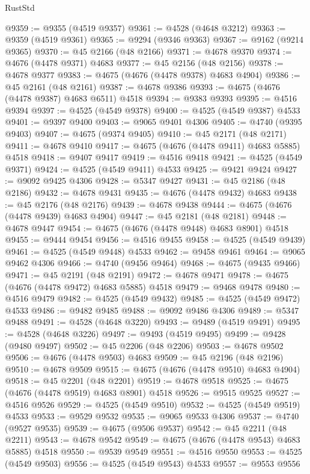 \begin{lexlean}{RustStd}
\begin{coremodule}
{\begin{coremodule}
{{{{{{{{{{{{{{{{{{{{{{{{{{{{{{{{{{{{{{{{{{{{{{{{{{{{{{{{{{{{@9359 := @9355 (@4519 @9357)
@9361 := @4528 (@4648 @3212)
@9363 := @9359 (@4519 @9361)
@9365 := @9294 (@9346 @9363)
@9367 := @9162 (@9214 @9365)
@9370 := @45 @2166 (@48 @2166)
@9371 := @4678 @9370
@9374 := @4676 (@4478 @9371) @4683
@9377 := @45 @2156 (@48 @2156)
@9378 := @4678 @9377
@9383 := @4675 (@4676 (@4478 @9378) @4683 @4904)
@9386 := @45 @2161 (@48 @2161)
@9387 := @4678 @9386
@9393 := @4675 (@4676 (@4478 @9387) @4683 @6511) @4518
@9394 := @9383 @9393
@9395 := @4516 @9394
@9397 := @4525 (@4549 @9378)
@9400 := @4525 (@4549 @9387) @4533
@9401 := @9397 @9400
@9403 := @9065 @9401 @4306
@9405 := @4740 (@9395 @9403)
@9407 := @4675 (@9374 @9405)
@9410 := @45 @2171 (@48 @2171)
@9411 := @4678 @9410
@9417 := @4675 (@4676 (@4478 @9411) @4683 @5885) @4518
@9418 := @9407 @9417
@9419 := @4516 @9418
@9421 := @4525 (@4549 @9371)
@9424 := @4525 (@4549 @9411) @4533
@9425 := @9421 @9424
@9427 := @9092 @9425 @4306
@9428 := @5347 @9427
@9431 := @45 @2186 (@48 @2186)
@9432 := @4678 @9431
@9435 := @4676 (@4478 @9432) @4683
@9438 := @45 @2176 (@48 @2176)
@9439 := @4678 @9438
@9444 := @4675 (@4676 (@4478 @9439) @4683 @4904)
@9447 := @45 @2181 (@48 @2181)
@9448 := @4678 @9447
@9454 := @4675 (@4676 (@4478 @9448) @4683 @8901) @4518
@9455 := @9444 @9454
@9456 := @4516 @9455
@9458 := @4525 (@4549 @9439)
@9461 := @4525 (@4549 @9448) @4533
@9462 := @9458 @9461
@9464 := @9065 @9462 @4306
@9466 := @4740 (@9456 @9464)
@9468 := @4675 (@9435 @9466)
@9471 := @45 @2191 (@48 @2191)
@9472 := @4678 @9471
@9478 := @4675 (@4676 (@4478 @9472) @4683 @5885) @4518
@9479 := @9468 @9478
@9480 := @4516 @9479
@9482 := @4525 (@4549 @9432)
@9485 := @4525 (@4549 @9472) @4533
@9486 := @9482 @9485
@9488 := @9092 @9486 @4306
@9489 := @5347 @9488
@9491 := @4528 (@4648 @3220)
@9493 := @9489 (@4519 @9491)
@9495 := @4528 (@4648 @3226)
@9497 := @9493 (@4519 @9495)
@9499 := @9428 (@9480 @9497)
@9502 := @45 @2206 (@48 @2206)
@9503 := @4678 @9502
@9506 := @4676 (@4478 @9503) @4683
@9509 := @45 @2196 (@48 @2196)
@9510 := @4678 @9509
@9515 := @4675 (@4676 (@4478 @9510) @4683 @4904)
@9518 := @45 @2201 (@48 @2201)
@9519 := @4678 @9518
@9525 := @4675 (@4676 (@4478 @9519) @4683 @8901) @4518
@9526 := @9515 @9525
@9527 := @4516 @9526
@9529 := @4525 (@4549 @9510)
@9532 := @4525 (@4549 @9519) @4533
@9533 := @9529 @9532
@9535 := @9065 @9533 @4306
@9537 := @4740 (@9527 @9535)
@9539 := @4675 (@9506 @9537)
@9542 := @45 @2211 (@48 @2211)
@9543 := @4678 @9542
@9549 := @4675 (@4676 (@4478 @9543) @4683 @5885) @4518
@9550 := @9539 @9549
@9551 := @4516 @9550
@9553 := @4525 (@4549 @9503)
@9556 := @4525 (@4549 @9543) @4533
@9557 := @9553 @9556
}}}}}}}}}}}}}}}}}}}}}}}}}}}}}}}}}}}}}}}}}}}}}}}}}}}}}}}}}}}}
\end{coremodule}}
\end{coremodule}
\end{lexlean}
